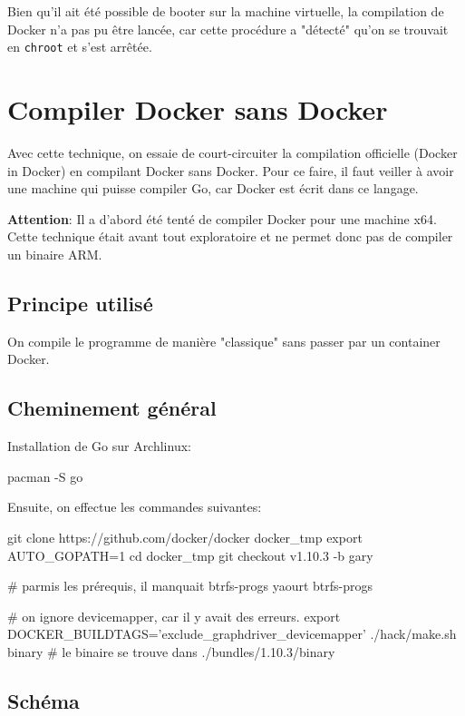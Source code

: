 \documentclass[11pt,a4paper,oneside]{report}
\newcommand{\code}[1]{\texttt{#1}} %
\begin{document}
Bien qu'il ait été possible de booter sur la machine virtuelle, la compilation de Docker n'a pas pu être lancée, car cette procédure a "détecté" qu'on se trouvait en \code{chroot} et s'est arrêtée.

\section{Compiler Docker sans Docker}

Avec cette technique, on essaie de court-circuiter la compilation officielle (Docker in Docker) en compilant Docker sans Docker. Pour ce faire, il faut veiller à avoir une machine qui puisse compiler Go, car Docker est écrit dans ce langage.

\textbf{Attention}: Il a d'abord été tenté de compiler Docker pour une machine x64. Cette technique était avant tout exploratoire et ne permet donc pas de compiler un binaire ARM.

\subsection{Principe utilisé}

On compile le programme de manière "classique" sans passer par un container Docker.

\subsection{Cheminement général}

Installation de Go sur Archlinux:

\begin{bashcode}
pacman -S go
\end{bashcode}

Ensuite, on effectue les commandes suivantes:

\begin{bashcode}
git clone https://github.com/docker/docker docker_tmp
export AUTO_GOPATH=1
cd docker_tmp
git checkout v1.10.3 -b gary

# parmis les prérequis, il manquait btrfs-progs
yaourt btrfs-progs

# on ignore devicemapper, car il y avait des erreurs.
export DOCKER_BUILDTAGS='exclude_graphdriver_devicemapper'
./hack/make.sh binary
# le binaire se trouve dans ./bundles/1.10.3/binary
\end{bashcode}

\subsection{Schéma}
\end{document}
